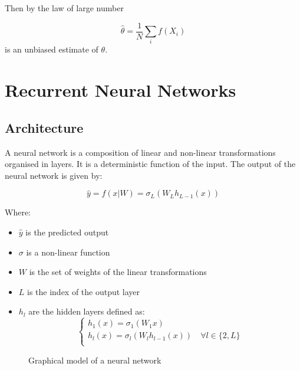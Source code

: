 \documentclass[10pt,oneside,openright]{report}
\begin{document}
Then by the law of large number 

$$ \hat{\theta} =  \frac{1}{N} \sum_i f(X_i) $$ is an unbiased estimate of $\theta$.

\section{Recurrent Neural Networks}

\subsection{Architecture}
A neural network is a composition of linear and non-linear transformations organised in layers. It is a deterministic function of the input. The output of the neural network is given by:

$$ \hat{y} = f(x | W) = \sigma_L (W_L h_{L-1}(x)) $$

Where:
\begin{itemize}
\item $\hat{y}$ is the predicted output
\item $\sigma$ is a non-linear function
\item $W$ is the set of weights of the linear transformations
\item $L$ is the index of the output layer
\item $h_l$ are the hidden layers defined as:
  \begin{equation}
    \begin{cases}
          h_1(x) = \sigma_1(W_1 x)\\
          h_l(x) = \sigma_l (W_l h_{l-1}(x)) \quad \forall l \in \{2, L\}\\
    \end{cases}
  \end{equation}


\end{itemize}

\begin{figure}[H]
\centering
{}
\caption{Graphical model of a neural network}
\end{figure}
\end{document}
